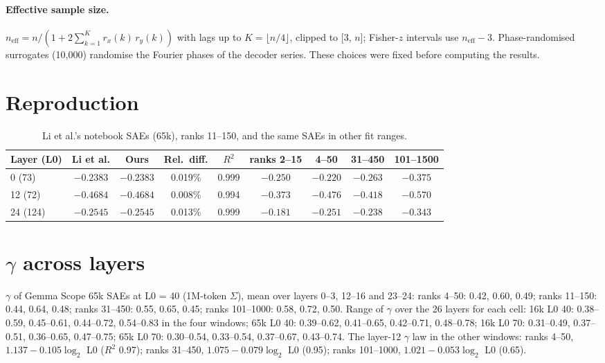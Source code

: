 \documentclass[10pt,twocolumn]{article}
\newcommand{\gam}{\gamma}
\begin{document}
\paragraph{Effective sample size.} $n_{\text{eff}} = n/(1 + 2\sum_{k=1}^{K} r_x(k)\,r_y(k))$ with lags up to $K = \lfloor n/4 \rfloor$, clipped to [3, $n$]; Fisher-$z$ intervals use $n_{\text{eff}}-3$. Phase-randomised surrogates (10,000) randomise the Fourier phases of the decoder series. These choices were fixed before computing the results.

\section{Reproduction}
\label{app:repro}

\begin{table}[h]
\centering
\small
\caption{Li et al.'s notebook SAEs (65k), ranks 11--150, and the same SAEs in other fit ranges.}
\label{tab:repro}
\begin{tabular}{lcccccccc}
\toprule
Layer (L0) & Li et al. & Ours & Rel.\ diff. & $R^2$ & ranks 2--15 & 4--50 & 31--450 & 101--1500 \\
\midrule
0 (73) & $-0.2383$ & $-0.2383$ & 0.019\% & 0.999 & $-0.250$ & $-0.220$ & $-0.263$ & $-0.375$ \\
12 (72) & $-0.4684$ & $-0.4684$ & 0.008\% & 0.994 & $-0.373$ & $-0.476$ & $-0.418$ & $-0.570$ \\
24 (124) & $-0.2545$ & $-0.2545$ & 0.013\% & 0.999 & $-0.181$ & $-0.251$ & $-0.238$ & $-0.343$ \\
\bottomrule
\end{tabular}
\end{table}

\section{\texorpdfstring{$\gamma$}{gamma} across layers}
\label{app:gamma}

$\gam$ of Gemma Scope 65k SAEs at L0 = 40 (1M-token $\Sigma$), mean over layers 0--3, 12--16 and 23--24: ranks 4--50: 0.42, 0.60, 0.49; ranks 11--150: 0.44, 0.64, 0.48; ranks 31--450: 0.55, 0.65, 0.45; ranks 101--1000: 0.58, 0.72, 0.50. Range of $\gam$ over the 26 layers for each cell: 16k L0 40: 0.38--0.59, 0.45--0.61, 0.44--0.72, 0.54--0.83 in the four windows; 65k L0 40: 0.39--0.62, 0.41--0.65, 0.42--0.71, 0.48--0.78; 16k L0 70: 0.31--0.49, 0.37--0.51, 0.36--0.65, 0.47--0.75; 65k L0 70: 0.30--0.54, 0.33--0.54, 0.37--0.67, 0.43--0.74. The layer-12 $\gam$ law in the other windows: ranks 4--50, $1.137 - 0.105\log_2$ L0 ($R^2$ 0.97); ranks 31--450, $1.075 - 0.079\log_2$ L0 (0.95); ranks 101--1000, $1.021 - 0.053\log_2$ L0 (0.65).
\end{document}
